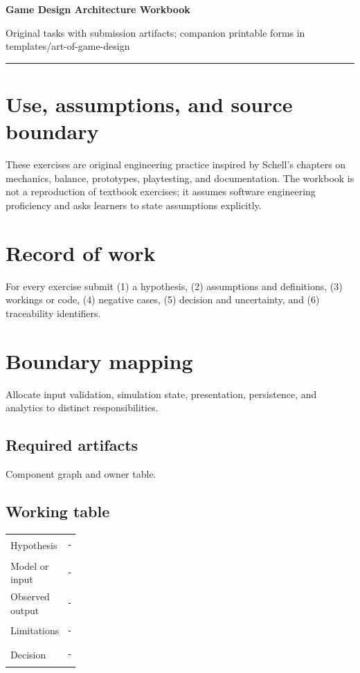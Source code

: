 \documentclass[11pt]{article}
\begin{document}
{\huge\bfseries\color{suiteblue} Game Design Architecture Workbook}\par
\vspace{0.15in}
{\normalsize\color{suitegray} Original tasks with submission artifacts; companion printable forms in templates/art-of-game-design}\par
\vspace{0.15in}\hrule\vspace{0.15in}

\section{Use, assumptions, and source boundary}
These exercises are original engineering practice inspired by Schell's chapters on mechanics, balance, prototypes, playtesting, and documentation. The workbook is not a reproduction of textbook exercises; it assumes software engineering proficiency and asks learners to state assumptions explicitly.


\section{Record of work}
For every exercise submit (1) a hypothesis, (2) assumptions and definitions, (3) workings or code, (4) negative cases, (5) decision and uncertainty, and (6) traceability identifiers.


\section{Boundary mapping}
Allocate input validation, simulation state, presentation, persistence, and analytics to distinct responsibilities.


\subsection{Required artifacts}
Component graph and owner table.


\subsection{Working table}
\begin{tabularx}{\linewidth}{@{}p{0.20\linewidth}X@{}}\toprule
Hypothesis & \rule{0.90\linewidth}{0.4pt}\\[0.35cm]
Model or input & \rule{0.90\linewidth}{0.4pt}\\[0.35cm]
Observed output & \rule{0.90\linewidth}{0.4pt}\\[0.35cm]
Limitations & \rule{0.90\linewidth}{0.4pt}\\[0.35cm]
Decision & \rule{0.90\linewidth}{0.4pt}\\\bottomrule\end{tabularx}
\end{document}

